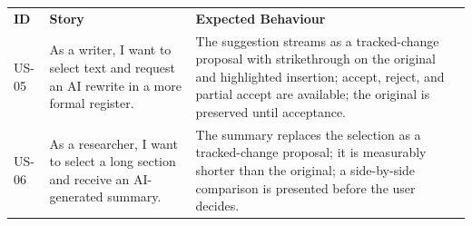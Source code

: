 \documentclass{article}
\begin{document}
     \noindent
{\small
\begin{tabularx}{\textwidth}{|>{\hsize=0.3\hsize\raggedright\arraybackslash}X|>{\hsize=1.2\hsize\raggedright\arraybackslash}X|>{\hsize=1.5\hsize\raggedright\arraybackslash}X|}
    \hline
    \rowcolor{tableBlue} 
    \textbf{\color{white}ID} & 
    \textbf{\color{white}Story} & 
    \textbf{\color{white} Expected Behaviour} \\
    US-05 &
    As a writer, I want to select text and request an AI rewrite in a more formal register. &
    The suggestion streams as a tracked-change proposal with strikethrough on the original and highlighted insertion; accept, reject, and partial accept are available; the original is preserved until acceptance. \\
    \hline
    US-06 &
    As a researcher, I want to select a long section and receive an AI-generated summary. &
    The summary replaces the selection as a tracked-change proposal; it is measurably shorter than the original; a side-by-side comparison is presented before the user decides. \\
    \hline


\end{tabularx}}
\end{document}
